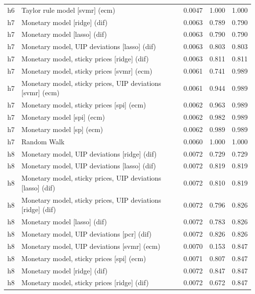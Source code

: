 \begin{ThreePartTable}
\begin{longtable}[t]{cp{5.5cm}ccc}
h6 & \raggedright Taylor rule model [svmr] (ecm) & 0.0047 & 1.000 & 1.000\\
\addlinespace
h7 & \raggedright Monetary model [ridge] (dif) & 0.0063 & 0.789 & 0.790\\
h7 & \raggedright Monetary model [lasso] (dif) & 0.0063 & 0.790 & 0.790\\
h7 & \raggedright Monetary model, UIP deviations [lasso] (dif) & 0.0063 & 0.803 & 0.803\\
h7 & \raggedright Monetary model, sticky prices [ridge] (dif) & 0.0063 & 0.811 & 0.811\\
h7 & \raggedright Monetary model, sticky prices [svmr] (ecm) & 0.0061 & 0.741 & 0.989\\
h7 & \raggedright Monetary model, sticky prices, UIP deviations [svmr] (ecm) & 0.0061 & 0.944 & 0.989\\
h7 & \raggedright Monetary model, sticky prices [spi] (ecm) & 0.0062 & 0.963 & 0.989\\
h7 & \raggedright Monetary model [spi] (ecm) & 0.0062 & 0.982 & 0.989\\
h7 & \raggedright Monetary model [sp] (ecm) & 0.0062 & 0.989 & 0.989\\
h7 & \raggedright Random Walk & 0.0060 & 1.000 & 1.000\\
\addlinespace
h8 & \raggedright Monetary model, UIP deviations [ridge] (dif) & 0.0072 & 0.729 & 0.729\\
h8 & \raggedright Monetary model, UIP deviations [lasso] (dif) & 0.0072 & 0.819 & 0.819\\
h8 & \raggedright Monetary model, sticky prices, UIP deviations [lasso] (dif) & 0.0072 & 0.810 & 0.819\\
h8 & \raggedright Monetary model, sticky prices, UIP deviations [ridge] (dif) & 0.0072 & 0.796 & 0.826\\
h8 & \raggedright Monetary model [lasso] (dif) & 0.0072 & 0.783 & 0.826\\
h8 & \raggedright Monetary model, UIP deviations [pcr] (dif) & 0.0072 & 0.826 & 0.826\\
h8 & \raggedright Monetary model, UIP deviations [svmr] (ecm) & 0.0070 & 0.153 & 0.847\\
h8 & \raggedright Monetary model, sticky prices [spi] (ecm) & 0.0071 & 0.807 & 0.847\\
h8 & \raggedright Monetary model [ridge] (dif) & 0.0072 & 0.847 & 0.847\\
h8 & \raggedright Monetary model, sticky prices [ridge] (dif) & 0.0072 & 0.672 & 0.847\\

\end{longtable}
\end{ThreePartTable}
